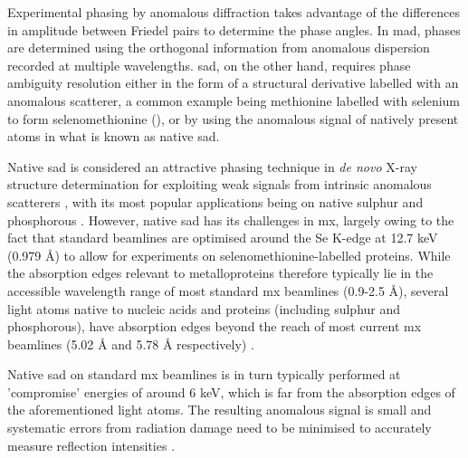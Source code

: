 Experimental phasing by anomalous diffraction takes advantage of the differences in amplitude between Friedel pairs to determine the phase angles. In \ac{mad}, phases are determined using the orthogonal information from anomalous dispersion recorded at multiple wavelengths. \Ac{sad}, on the other hand, requires phase ambiguity resolution either in the form of a structural derivative labelled with an anomalous scatterer, a common example being methionine labelled with selenium to form selenomethionine (), or by using the anomalous signal of natively present atoms in what is known as native \ac{sad}.

Native \ac{sad} is considered an attractive phasing technique in  \textit{de novo} X-ray structure determination %
for exploiting weak signals from intrinsic anomalous scatterers \cite{Basu2019}, with its most popular applications being on native sulphur and phosphorous \cite{Karasawa2022}. However, native \ac{sad} has its challenges in \ac{mx}, largely owing to the fact that standard beamlines are optimised around the Se K-edge at 12.7 \unit{keV} (0.979 Å) to allow for experiments on selenomethionine-labelled proteins.
While the absorption edges relevant to metalloproteins therefore typically lie in the accessible wavelength range of most standard \ac{mx} beamlines (0.9-2.5 Å), %
several light atoms native to nucleic acids and proteins (including sulphur and phosphorous), have absorption edges beyond the reach of most current \ac{mx} beamlines (5.02 Å and 5.78 Å respectively) \cite{Olieric2016}. 

Native \ac{sad} on standard \ac{mx} beamlines is in turn typically performed at 'compromise' energies of around 6 \unit{keV}, which is far from the absorption edges of the aforementioned light atoms. The resulting anomalous signal is small and systematic errors from radiation damage need to be minimised to accurately measure reflection intensities \cite{DjinovicCarugo2005}.%


